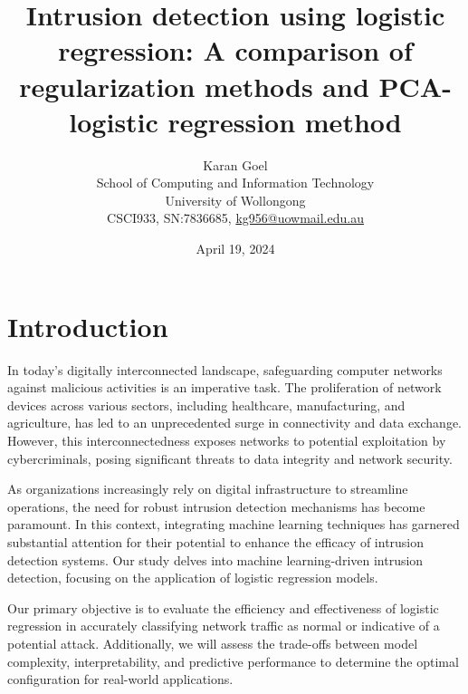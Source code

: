 \documentclass[a4paper,10pt,twocolumn]{article}
\title{Intrusion detection using logistic regression: A comparison of regularization methods and PCA-logistic regression method}
\author{Karan Goel \\
        School of Computing and Information Technology\\
        University of Wollongong\\
        CSCI933, SN:7836685, \url{kg956@uowmail.edu.au}}
\date{April 19, 2024}
\begin{document}
\onehalfspacing
{}

\section{Introduction}
\label{sec:introduction}
In today's digitally interconnected landscape, safeguarding computer networks against malicious activities is an imperative task. The proliferation of network devices across various sectors, including healthcare, manufacturing, and agriculture, has led to an unprecedented surge in connectivity and data exchange. However, this interconnectedness exposes networks to potential exploitation by cybercriminals, posing significant threats to data integrity and network security.

As organizations increasingly rely on digital infrastructure to streamline operations, the need for robust intrusion detection mechanisms has become paramount. In this context, integrating machine learning techniques has garnered substantial attention for their potential to enhance the efficacy of intrusion detection systems. Our study delves into machine learning-driven intrusion detection, focusing on the application of logistic regression models.

Our primary objective is to evaluate the efficiency and effectiveness of logistic regression in accurately classifying network traffic as normal or indicative of a potential attack. Additionally, we will assess the trade-offs between model complexity, interpretability, and predictive performance to determine the optimal configuration for real-world applications.
\end{document}
